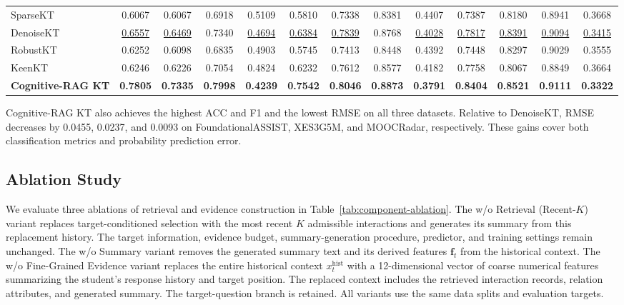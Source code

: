 \documentclass{llncs}
\begin{document}
\begin{table}[t]
\begin{tabular}{@{}l*{12}{c}@{}}
SparseKT & 0.6067 & 0.6067 & 0.6918 & 0.5109 & 0.5810 & 0.7338 & 0.8381 & 0.4407 & 0.7387 & 0.8180 & 0.8941 & 0.3668 \\
DenoiseKT & \underline{0.6557} & \underline{0.6469} & 0.7340 & \underline{0.4694} & \underline{0.6384} & \underline{0.7839} & 0.8768 & \underline{0.4028} & \underline{0.7817} & \underline{0.8391} & \underline{0.9094} & \underline{0.3415} \\
RobustKT & 0.6252 & 0.6098 & 0.6835 & 0.4903 & 0.5745 & 0.7413 & 0.8448 & 0.4392 & 0.7448 & 0.8297 & 0.9029 & 0.3555 \\
KeenKT & 0.6246 & 0.6226 & 0.7054 & 0.4824 & 0.6232 & 0.7612 & 0.8577 & 0.4182 & 0.7758 & 0.8067 & 0.8849 & 0.3664 \\
\midrule
\textbf{Cognitive-RAG KT} & \textbf{0.7805} & \textbf{0.7335} & \textbf{0.7998} & \textbf{0.4239} & \textbf{0.7542} & \textbf{0.8046} & \textbf{0.8873} & \textbf{0.3791} & \textbf{0.8404} & \textbf{0.8521} & \textbf{0.9111} & \textbf{0.3322} \\
\bottomrule
\end{tabular}
\end{table}

Cognitive-RAG KT also achieves the highest ACC and F1 and the lowest RMSE on all three datasets. Relative to DenoiseKT, RMSE decreases by 0.0455, 0.0237, and 0.0093 on FoundationalASSIST, XES3G5M, and MOOCRadar, respectively. These gains cover both classification metrics and probability prediction error.

\subsection{Ablation Study}

We evaluate three ablations of retrieval and evidence construction in Table~\ref{tab:component-ablation}. The w/o Retrieval (Recent-$K$) variant replaces target-conditioned selection with the most recent $K$ admissible interactions and generates its summary from this replacement history. The target information, evidence budget, summary-generation procedure, predictor, and training settings remain unchanged. The w/o Summary variant removes the generated summary text and its derived features $\mathbf f_t$ from the historical context. The w/o Fine-Grained Evidence variant replaces the entire historical context $x_t^{\mathrm{hist}}$ with a 12-dimensional vector of coarse numerical features summarizing the student's response history and target position. The replaced context includes the retrieved interaction records, relation attributes, and generated summary. The target-question branch is retained. All variants use the same data splits and evaluation targets.
\end{document}
